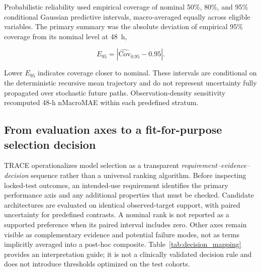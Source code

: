 \documentclass[preprint,12pt]{elsarticle}
\begin{document}
Probabilistic reliability used empirical coverage of nominal 50\%,
80\%, and 95\% conditional Gaussian predictive intervals,
macro-averaged equally across eligible variables. The primary summary
was the absolute deviation of empirical 95\% coverage from its nominal
level at 48~h,

\begin{equation}
E_{95}
=
\left|
\widehat{\mathrm{Cov}}_{0.95}
-
0.95
\right|.
\end{equation}

Lower $E_{95}$ indicates coverage closer to nominal. These intervals
are conditional on the deterministic recursive mean trajectory and do
not represent uncertainty fully propagated over stochastic future
paths. Observation-density sensitivity recomputed 48-h nMacroMAE within
each predefined stratum.


\subsection{From evaluation axes to a fit-for-purpose selection decision}
\label{sec:selection_mapping}

TRACE operationalizes model selection as a transparent \emph{requirement--evidence--decision} sequence rather than a universal ranking algorithm. Before inspecting locked-test outcomes, an intended-use requirement identifies the primary performance axis and any additional properties that must be checked. Candidate architectures are evaluated on identical observed-target support, with paired uncertainty for predefined contrasts. A nominal rank is not reported as a supported preference when its paired interval includes zero. Other axes remain visible as complementary evidence and potential failure modes, not as terms implicitly averaged into a post-hoc composite. Table~\ref{tab:decision_mapping} provides an interpretation guide; it is not a clinically validated decision rule and does not introduce thresholds optimized on the test cohorts.
\end{document}
